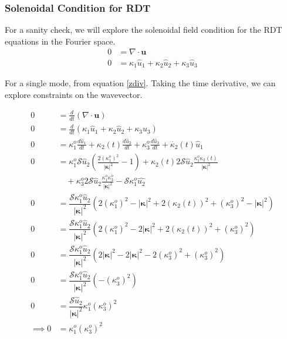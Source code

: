\documentclass[paper=a4, fontsize=11pt]{scrartcl} %
\numberwithin{equation}{section} %
\numberwithin{figure}{section} %
\numberwithin{table}{section} %
\begin{document}
\subsubsection{Solenoidal Condition for RDT}\label{rdt_zero_div}
For a sanity check, we will explore the solenoidal field condition for the RDT equations in the Fourier space.
\begin{align}
    0 &= \nabla \cdot \bm{u} \\
   0 &= \kappa_1 \hat{u}_1 + \kappa_2 \hat{u}_2 + \kappa_3 \hat{u}_3
\end{align}

For a single mode, from equation \ref{zdiv}. Taking the time derivative, we can explore constraints on the wavevector.

\begin{align}
    0 &= \frac{d}{dt} \left( \nabla \cdot \bm{u} \right ) \\
    0 &= \frac{d}{dt} \left( \kappa_1 \hat{u}_1 + \kappa_2 \hat{u}_2 + \kappa_3 \hat{u}_3 \right ) \\
    0 &= \kappa_1^o \frac{d\hat{u}_1}{dt} + 
        \kappa_2(t) \frac{d\hat{u}_2}{dt} + 
        \kappa_3^o \frac{d\hat{u}_3}{dt} + \dot{\kappa_2}(t) \hat{u}_1 
    \\
    0 &= \kappa_1^o \mathcal{S} \hat{u}_2 \left ( \frac{2 \left( \kappa_1^o \right )^2}{  | \bm{\kappa} |^2  } - 1 \right )
        + \kappa_2(t) 2 \mathcal{S} \hat{u} _2
             \frac{ \kappa_1^o \kappa_2(t) }{  | \bm{\kappa} |^2  } \\
    & \quad  + \kappa_3^o 2 \mathcal{S} \hat{u} _2
             \frac{ \kappa_1^o \kappa_3^o }{  | \bm{\kappa} |^2  } 
        - \mathcal{S} \kappa_1^o \hat{u_2} 
    \\
    0 &= \dfrac{\mathcal{S} \kappa_1^o \hat{u}_2}{| \bm{\kappa} |^2  } \left ( 
        2 \left( \kappa_1^o \right )^2 - | \bm{\kappa} |^2
        + 2 \left( \kappa_2(t) \right )^2 + \left( \kappa_3^o \right )^2 
        - | \bm{\kappa} |^2  \right ) 
    \\
    0 &= \dfrac{\mathcal{S} \kappa_1^o \hat{u}_2}{| \bm{\kappa} |^2  } \left ( 
        2 \left( \kappa_1^o \right )^2 - 2 | \bm{\kappa} |^2
        + 2 \left( \kappa_2(t) \right )^2 + \left( \kappa_3^o \right )^2 
        \right ) 
    \\
    0 &= \dfrac{\mathcal{S} \kappa_1^o \hat{u}_2}{| \bm{\kappa} |^2  } \left ( 
        2 | \bm{\kappa} |^2  - 2 | \bm{\kappa} |^2
        - 2 \left( \kappa_3^o \right )^2  + \left( \kappa_3^o \right )^2 
        \right ) 
    \\
    0 &= \dfrac{\mathcal{S} \kappa_1^o \hat{u}_2}{| \bm{\kappa} |^2  } \left ( 
        -  \left( \kappa_3^o \right )^2 
        \right ) 
    \\
    0 &= \dfrac{\mathcal{S} \hat{u}_2}{| \bm{\kappa} |^2  } \kappa_1^o 
        \left( \kappa_3^o \right )^2 
    \\
    \implies 0 &= \kappa_1^o  \left( \kappa_3^o \right )^2 
\end{align}
\end{document}
